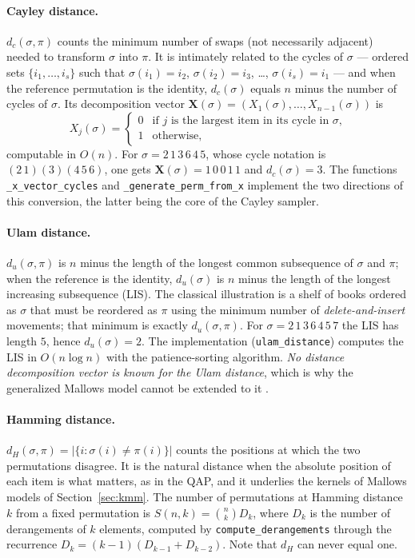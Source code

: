 \documentclass[a4paper,11pt]{article}
\begin{document}
\paragraph{Cayley distance.}
$d_c(\sigma,\pi)$ counts the minimum number of swaps (not necessarily adjacent)
needed to transform $\sigma$ into $\pi$.  It is intimately related to the cycles
of $\sigma$ --- ordered sets $\{i_1,\ldots,i_s\}$ such that $\sigma(i_1)=i_2$,
$\sigma(i_2)=i_3$, \ldots, $\sigma(i_s)=i_1$ --- and when the reference
permutation is the identity, $d_c(\sigma)$ equals $n$ minus the number of cycles
of $\sigma$.  Its decomposition vector
$\mathbf{X}(\sigma)=(X_1(\sigma),\ldots,X_{n-1}(\sigma))$ is
\begin{equation}
X_j(\sigma) =
 \begin{cases}
   0 & \text{if $j$ is the largest item in its cycle in $\sigma$,} \\
   1 & \text{otherwise,}
  \end{cases}
 \label{eq:cayley_decomp}
\end{equation}
computable in $O(n)$.  For $\sigma = 2\,1\,3\,6\,4\,5$, whose cycle notation is
$(2\,1)(3)(4\,5\,6)$, one gets $\mathbf{X}(\sigma)=1\,0\,0\,1\,1$ and
$d_c(\sigma)=3$.  The functions \texttt{\_x\_vector\_cycles} and
\texttt{\_generate\_perm\_from\_x} implement the two directions of this
conversion, the latter being the core of the Cayley sampler.

\paragraph{Ulam distance.}
$d_u(\sigma,\pi)$ is $n$ minus the length of the longest common subsequence of
$\sigma$ and $\pi$; when the reference is the identity, $d_u(\sigma)$ is $n$
minus the length of the longest increasing subsequence (LIS).  The classical
illustration \citep{Diaconis:1988} is a shelf of books ordered as $\sigma$ that
must be reordered as $\pi$ using the minimum number of \emph{delete-and-insert}
movements; that minimum is exactly $d_u(\sigma,\pi)$.  For
$\sigma=2\,1\,3\,6\,4\,5\,7$ the LIS has length $5$, hence $d_u(\sigma)=2$.  The
implementation (\texttt{ulam\_distance}) computes the LIS in $O(n \log n)$ with
the patience-sorting algorithm.  \emph{No distance decomposition vector is known
for the Ulam distance}, which is why the generalized Mallows model cannot be
extended to it \citep{Irurozki_et_al:2014}.

\paragraph{Hamming distance.}
$d_H(\sigma,\pi) = |\{i : \sigma(i) \neq \pi(i)\}|$ counts the positions at
which the two permutations disagree.  It is the natural distance when the
absolute position of each item is what matters, as in the QAP, and it underlies
the kernels of Mallows models of Section~\ref{sec:kmm}.  The number of
permutations at Hamming distance $k$ from a fixed permutation is
$S(n,k) = \binom{n}{k} D_k$, where $D_k$ is the number of derangements of $k$
elements, computed by \texttt{compute\_derangements} through the recurrence
$D_k = (k-1)(D_{k-1}+D_{k-2})$.  Note that $d_H$ can never equal one.
\end{document}

